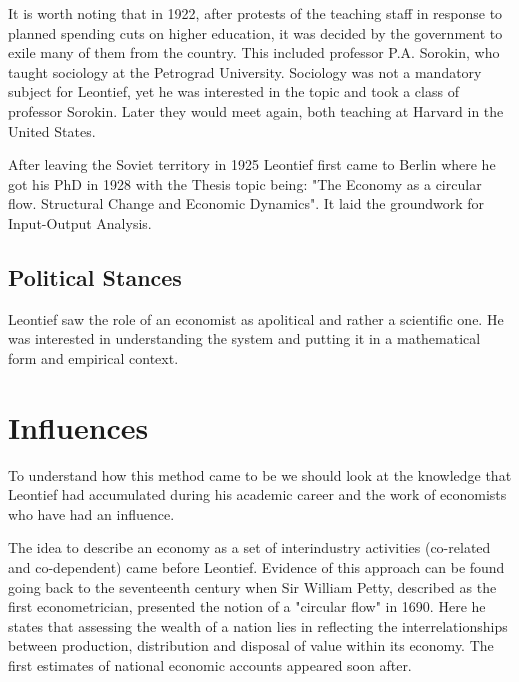 \documentclass[12pt,a4paper]{scrartcl}
\begin{document}
	It is worth noting that in 1922, after protests of the teaching staff in response to planned spending cuts on higher education, it was decided by the government to exile many of them from the country. This included professor P.A. Sorokin, who taught sociology at the Petrograd University. Sociology was not a mandatory subject for Leontief, yet he was interested in the topic and took a class of professor Sorokin. Later they would meet again, both teaching at Harvard in the United States. \cite[p.353]{Kaliadina2006}
	
	After leaving the Soviet territory in 1925 Leontief first came to Berlin where he got his PhD in 1928 with the Thesis topic being: "The Economy as a circular flow. Structural Change and Economic Dynamics". It laid the groundwork for Input-Output Analysis.
	
	
	\subsection{Political Stances}
	
	Leontief saw the role of an economist as apolitical and rather a scientific one. He was interested in understanding the system and putting it in a mathematical form and empirical context.
	
	\section{Influences} \label{influences}
	
	To understand how this method came to be we should look at the knowledge that Leontief had accumulated during his academic career and the work of economists who have had an influence. 
	
	The idea to describe an economy as a set of interindustry activities (co-related and co-dependent) came before Leontief. Evidence of this approach can be found going back to the seventeenth century when Sir William Petty, described as the first econometrician, presented the notion of a "circular flow" in 1690. Here he states that assessing the wealth of a nation lies in reflecting the interrelationships between production, distribution and disposal of value within its economy. The first estimates of national economic accounts appeared soon after.
	
\end{document}
